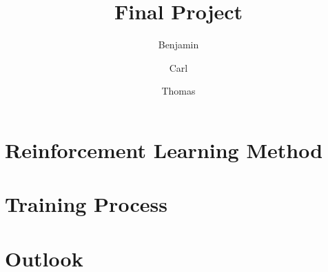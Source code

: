 \documentclass[12pt, a4paper, bibliography=totoc]{scrreprt}
\title{Final Project}
\author{Benjamin \and Carl \and Thomas}
\begin{document}
\maketitle

\chapter{Reinforcement Learning Method}

\chapter{Training Process}

\chapter{Outlook}



\appendix
\printbibliography
\end{document}
